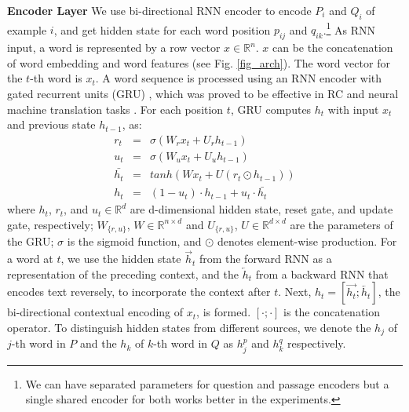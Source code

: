\documentclass[letterpaper]{article}
\begin{document}
\noindent\textbf{Encoder Layer}
We use bi-directional RNN encoder to encode $P_i$ and $Q_i$ of example $i$, and get hidden state for each word position $p_{ij}$ and $q_{ik}$.\footnote{We can have separated parameters for question and passage encoders but a single shared encoder for both works better in the experiments.}
As RNN input, a word is represented by a row vector $x \in \mathbb{R}^n$. $x$ can be the concatenation of word embedding and word features (see Fig. \ref{fig_arch}). The word vector for the $t$-th word is $x_t$. A word sequence is processed using an RNN encoder with gated recurrent units (GRU) \cite{bengio2015deep}, which was proved to be effective in RC and neural machine translation tasks \cite{bahdanau2014neural,kadlec2016text,dhingra2016gated}. For each position $t$, GRU computes $h_t$ with input $x_t$ and previous state $h_{t-1}$, as:
\begin{eqnarray}
  r_t &=&\sigma(W_rx_t+U_rh_{t-1}) \\
  u_t &=&\sigma(W_ux_t+U_uh_{t-1}) \\
  \bar{h_t}&=&tanh(Wx_t+U(r_t\odot h_{t-1})) \\
  h_t&=&(1-u_t)\cdot h_{t-1} + u_t \cdot \bar{h_t}
\end{eqnarray}
where $h_t$, $r_t$, and $u_t \in \mathbb{R}^d$ are d-dimensional hidden state, reset gate, and update gate, respectively; $W_{\{r,u\}}$, $W \in \mathbb{R}^{n\times d}$ and $U_{\{r,u\}}$, $U \in \mathbb{R}^{d\times d}$ are the parameters of the GRU; $\sigma$ is the sigmoid function, and $\odot$ denotes element-wise production. For a word at $t$, we use the hidden state $\overrightarrow{h}_t$ from the forward RNN as a representation of the preceding context, and the $\overleftarrow{h}_t$ from a backward RNN that encodes text reversely, to incorporate the context after $t$. Next, $h_t=[\overrightarrow{h_t};\overleftarrow{h_t}]$, the bi-directional contextual encoding of $x_t$, is formed. $[\cdot ;\cdot]$ is the concatenation operator. To distinguish hidden states from different sources, we denote the $h_j$ of $j$-th word in $P$ and the $h_k$ of $k$-th word in $Q$ as $h^p_{j}$ and $h^q_{k}$ respectively.
\end{document}
